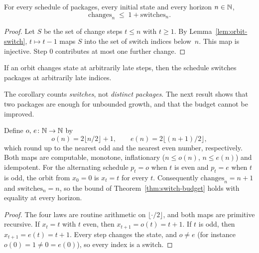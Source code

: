 \begin{theorem}\label{thm:switch-budget}
For every schedule of packages, every initial state and every horizon $n\in\mathbb{N}$,
\[
\mathrm{changes}_n\;\le\;1+\mathrm{switches}_n .
\]
\end{theorem}

\begin{proof}
Let $S$ be the set of change steps $t\le n$ with $t\ge 1$. By Lemma~\ref{lem:orbit-switch}, $t\mapsto t-1$ maps $S$ into the set of switch indices below~$n$. This map is injective. Step $0$ contributes at most one further change.
\end{proof}

\begin{corollary}\label{cor:unbounded}
If an orbit changes state at arbitrarily late steps, then the schedule switches packages at arbitrarily late indices.
\end{corollary}

The corollary counts \emph{switches}, not \emph{distinct packages}. The next result shows that two packages are enough for unbounded growth, and that the budget cannot be improved.

\begin{proposition}[Sharpness]\label{prop:sharpness}
Define $o,\,e\colon\mathbb{N}\to\mathbb{N}$ by
\[
o(n)=2\lfloor n/2\rfloor+1,\qquad e(n)=2\lfloor (n+1)/2\rfloor ,
\]
which round up to the nearest odd and the nearest even number, respectively. Both maps are computable, monotone, inflationary ($n\le o(n)$, $n\le e(n)$) and idempotent. For the alternating schedule $p_t=o$ when $t$ is even and $p_t=e$ when $t$ is odd, the orbit from $x_0=0$ is $x_t=t$ for every $t$. Consequently $\mathrm{changes}_n=n+1$ and $\mathrm{switches}_n=n$, so the bound of Theorem~\ref{thm:switch-budget} holds with equality at every horizon.
\end{proposition}

\begin{proof}
The four laws are routine arithmetic on $\lfloor\cdot/2\rfloor$, and both maps are primitive recursive. If $x_t=t$ with $t$ even, then $x_{t+1}=o(t)=t+1$. If $t$ is odd, then $x_{t+1}=e(t)=t+1$. Every step changes the state, and $o\neq e$ (for instance $o(0)=1\neq 0=e(0)$), so every index is a switch.
\end{proof}


